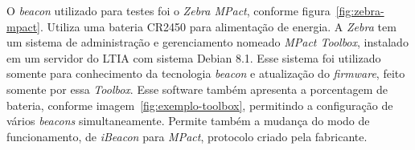 \documentclass[
	12pt,				%
	openright,			%
	oneside,			%
	a4paper,			%
	chapter=TITLE,		%
	english,			%
	brazil				%
	]{abntex2}
\begin{document}
{O \textit{beacon} utilizado para testes foi o \textit{Zebra MPact}, conforme figura~\ref{fig:zebra-mpact}. Utiliza uma bateria CR2450 para alimentação de energia. A \textit{Zebra} tem um sistema de administração e gerenciamento nomeado \textit{MPact Toolbox}, instalado em um servidor do LTIA com sistema Debian 8.1. Esse sistema foi utilizado somente para conhecimento da tecnologia \textit{beacon} e atualização do \textit{firmware}, feito somente por essa \textit{Toolbox}. Esse software também apresenta a porcentagem de bateria, conforme imagem~\ref{fig:exemplo-toolbox}, permitindo a configuração de vários \textit{beacons} simultaneamente. Permite também a mudança do modo de funcionamento, de \textit{iBeacon} para \textit{MPact}, protocolo criado pela fabricante.

\begin{figure}[htb]
\end{figure}

\begin{figure}[htb]
\end{figure}

}
\end{document}
